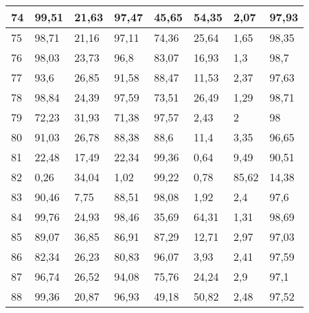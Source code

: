 \begin{longtable}[c]{|l|l|l|l|l|l|l|l|}
74              & 99,51        & 21,63        & 97,47       & 45,65         & 54,35         & 2,07          & 97,93         \\ \hline
75              & 98,71        & 21,16        & 97,11       & 74,36         & 25,64         & 1,65          & 98,35         \\ \hline
76              & 98,03        & 23,73        & 96,8        & 83,07         & 16,93         & 1,3           & 98,7          \\ \hline
77              & 93,6         & 26,85        & 91,58       & 88,47         & 11,53         & 2,37          & 97,63         \\ \hline
78              & 98,84        & 24,39        & 97,59       & 73,51         & 26,49         & 1,29          & 98,71         \\ \hline
79              & 72,23        & 31,93        & 71,38       & 97,57         & 2,43          & 2             & 98            \\ \hline
80              & 91,03        & 26,78        & 88,38       & 88,6          & 11,4          & 3,35          & 96,65         \\ \hline
81              & 22,48        & 17,49        & 22,34       & 99,36         & 0,64          & 9,49          & 90,51         \\ \hline
82              & 0,26         & 34,04        & 1,02        & 99,22         & 0,78          & 85,62         & 14,38         \\ \hline
83              & 90,46        & 7,75         & 88,51       & 98,08         & 1,92          & 2,4           & 97,6          \\ \hline
84              & 99,76        & 24,93        & 98,46       & 35,69         & 64,31         & 1,31          & 98,69         \\ \hline
85              & 89,07        & 36,85        & 86,91       & 87,29         & 12,71         & 2,97          & 97,03         \\ \hline
86              & 82,34        & 26,23        & 80,83       & 96,07         & 3,93          & 2,41          & 97,59         \\ \hline
87              & 96,74        & 26,52        & 94,08       & 75,76         & 24,24         & 2,9           & 97,1          \\ \hline
88              & 99,36        & 20,87        & 96,93       & 49,18         & 50,82         & 2,48          & 97,52         \\ \hline

\end{longtable}

